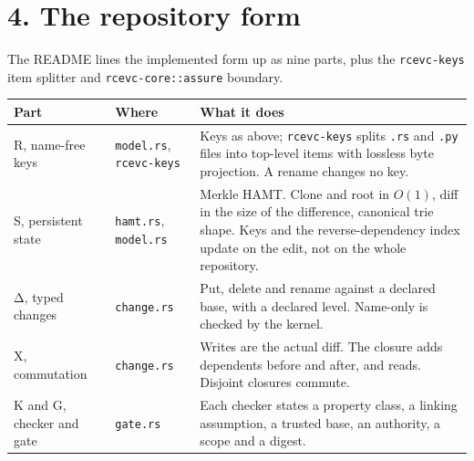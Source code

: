 \documentclass[10pt,letterpaper]{article}
\newcounter{none}
\begin{document}
\section{4. The repository form}\label{the-repository-form}

The README lines the implemented form up as nine parts, plus the
\texttt{rcevc-keys} item splitter and \texttt{rcevc-\allowbreak{}core::assure}
boundary.

{\def\LTcaptype{none} %
{\footnotesize\setlength{\tabcolsep}{3.8pt}\renewcommand{\arraystretch}{1.15}
\begin{longtable}[]{@{}
  >{\raggedright\arraybackslash}p{}
  >{\raggedright\arraybackslash}p{}
  >{\raggedright\arraybackslash}p{}@{}}
\toprule\noalign{}
\begin{minipage}[b]{\linewidth}\raggedright
\textbf{Part}
\end{minipage} & \begin{minipage}[b]{\linewidth}\raggedright
\textbf{Where}
\end{minipage} & \begin{minipage}[b]{\linewidth}\raggedright
\textbf{What it does}
\end{minipage} \\
\midrule\noalign{}
\endhead
\bottomrule\noalign{}
\endlastfoot
R, name-free keys & \texttt{model.rs}, \texttt{rcevc-keys} & Keys as
above; \texttt{rcevc-keys} splits \texttt{.rs} and \texttt{.py} files
into top-level items with lossless byte projection. A rename changes no
key. \\
S, persistent state & \texttt{hamt.rs}, \texttt{model.rs} & Merkle HAMT.
Clone and root in \(O(1)\), diff in the size of the difference,
canonical trie shape. Keys and the reverse-dependency index update on
the edit, not on the whole repository. \\
Δ, typed changes & \texttt{change.rs} & Put, delete and rename against a
declared base, with a declared level. Name-only is checked by the
kernel. \\
X, commutation & \texttt{change.rs} & Writes are the actual diff. The
closure adds dependents before and after, and reads. Disjoint closures
commute. \\
K and G, checker and gate & \texttt{gate.rs} & Each checker states a
property class, a linking assumption, a trusted base, an authority, a
scope and a digest. \\

\end{longtable}}}
\end{document}
